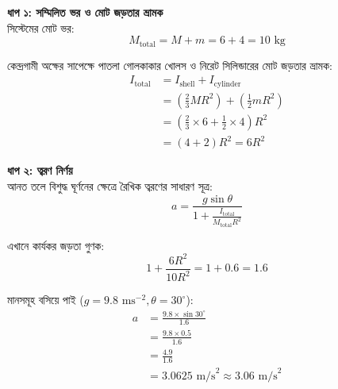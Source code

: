 \documentclass[12pt, a4paper]{article}
\begin{document}
\begin{tcolorbox}[solutionbox={সমাধান (Solution)}]
    \noindent
    \textbf{ধাপ ১: সম্মিলিত ভর ও মোট জড়তার ভ্রামক} \\
    সিস্টেমের মোট ভর:
    \[ M_{\text{total}} = M + m = 6 + 4 = 10\text{ kg} \]
    
    কেন্দ্রগামী অক্ষের সাপেক্ষে পাতলা গোলকাকার খোলস ও নিরেট সিলিন্ডারের মোট জড়তার ভ্রামক:
    \begin{align*}
        I_{\text{total}} &= I_{\text{shell}} + I_{\text{cylinder}} \\
        &= \left(\frac{2}{3} M R^2\right) + \left(\frac{1}{2} m R^2\right) \\
        &= \left(\frac{2}{3} \times 6 + \frac{1}{2} \times 4\right) R^2 \\
        &= (4 + 2) R^2 = 6 R^2
    \end{align*}
    
    \vspace{0.5em}
    \noindent\textbf{ধাপ ২: ত্বরণ নির্ণয়} \\
    আনত তলে বিশুদ্ধ ঘূর্ণনের ক্ষেত্রে রৈখিক ত্বরণের সাধারণ সূত্র:
    \[ a = \frac{g \sin\theta}{1 + \frac{I_{\text{total}}}{M_{\text{total}} R^2}} \]
    
    এখানে কার্যকর জড়তা গুণক:
    \[ 1 + \frac{6 R^2}{10 R^2} = 1 + 0.6 = 1.6 \]
    
    মানসমূহ বসিয়ে পাই ($g = 9.8\text{ ms}^{-2}, \theta = 30^\circ$):
    \begin{align*}
        a &= \frac{9.8 \times \sin 30^\circ}{1.6} \\
          &= \frac{9.8 \times 0.5}{1.6} \\
          &= \frac{4.9}{1.6} \\
          &= \mathbf{3.0625}\text{ m/s}^2 \approx \mathbf{3.06}\text{ m/s}^2
    \end{align*}
\end{tcolorbox}
\end{document}
